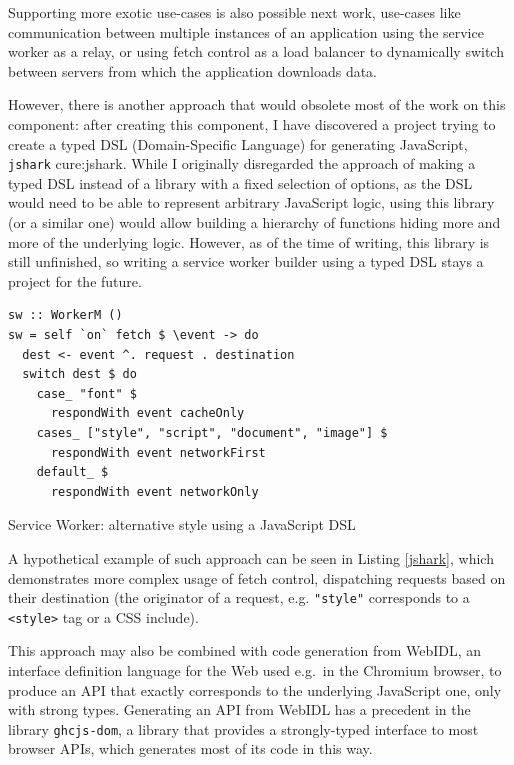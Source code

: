 \documentclass[english,zadani,odsaz]{fitthesis}
\begin{document}
Supporting more exotic use-cases is also possible next work, use-cases like
communication between multiple instances of an application using the service
worker as a relay, or using fetch control as a load balancer to dynamically
switch between servers from which the application downloads data.

However, there is another approach that would obsolete most of the work on this
component: after creating this component, I have discovered a project trying to
create a typed DSL (Domain-Specific Language) for generating JavaScript, \texttt{jshark}
cure:jshark. While I originally disregarded the approach of making a typed DSL
instead of a library with a fixed selection of options, as the DSL would need to
be able to represent arbitrary JavaScript logic, using this library (or a
similar one) would allow building a hierarchy of functions hiding more and more
of the underlying logic. However, as of the time of writing, this library is
still unfinished, so writing a service worker builder using a typed DSL stays a
project for the future.

\begin{listing}[!b]
\begin{verbatim}
sw :: WorkerM ()
sw = self `on` fetch $ \event -> do
  dest <- event ^. request . destination
  switch dest $ do
    case_ "font" $
      respondWith event cacheOnly
    cases_ ["style", "script", "document", "image"] $
      respondWith event networkFirst
    default_ $
      respondWith event networkOnly
\end{verbatim}
\caption{Service Worker: alternative style using a JavaScript DSL \label{jshark}}
\end{listing}

A hypothetical example of such approach can be seen in Listing \ref{jshark}, which
demonstrates more complex usage of fetch control, dispatching requests based on
their destination (the originator of a request, e.g. \texttt{"style"} corresponds
to a \texttt{<style>} tag or a CSS include).

This approach may also be combined with code generation from WebIDL, an
interface definition language for the Web \cite{webidl} used e.g.~in the Chromium
browser, to produce an API that exactly corresponds to the underlying JavaScript
one, only with strong types. Generating an API from WebIDL has a precedent in
the library \texttt{ghcjs-dom}, a library that provides a strongly-typed interface to
most browser APIs, which generates most of its code in this way.
\end{document}
